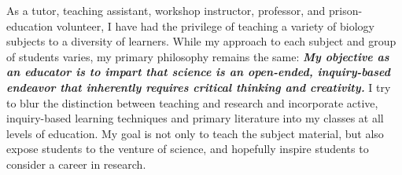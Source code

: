 As a tutor, teaching assistant, workshop
instructor, professor, and prison-education volunteer,
I have had the privilege of teaching a variety of biology subjects to a
diversity of learners.
While my approach to each subject and group of students varies, my primary
philosophy remains the same:
\textbf{\textit{My objective as an educator is to impart that
        science
        is an open-ended, inquiry-based endeavor that inherently requires
        critical thinking and creativity.}}
I try to blur the distinction between teaching and research and incorporate
active, inquiry-based learning techniques and primary literature into my
classes at all levels of
education.
My goal is not only to teach the subject material, but also expose students to
the venture of science, and hopefully inspire students to consider a
career in research.

